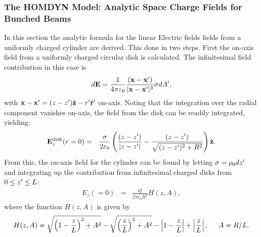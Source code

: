 \subsubsection{The HOMDYN Model: Analytic Space Charge Fields for Bunched Beams}

In this section the analytic formula for the linear Electric fields fields
from a uniformly charged cylinder are derived. This done in two steps. First
the on-axis field from a uniformly charged circular disk is calculated. The
infinitesimal field contribution in this case is
%
\begin{eqnarray}
d\mathbf{E} =
\frac{1}{4\pi\epsilon_0}\frac{(\mathbf{x}-\mathbf{x}\primed)}
{|\mathbf{x}-\mathbf{x}\primed|^3}\sigma dA\primed,\nonumber
\end{eqnarray}
%
with $\mathbf{x}-\mathbf{x}^{\prime}=
(z-z^{\prime})\hat{\mathbf{z}}-r^{\prime}\hat{\mathbf{r}}^{\prime}$ on-axis.
Noting that the integration over the radial component vanishes on-axis, the
field from the disk can be readily integrated, yielding:
%
\begin{eqnarray}
\mathbf{E}_{z}^{\textmd{disk}}(r=0) &=&
\frac{\sigma}{2\epsilon_0}
\left(\frac{(z-z\primed)}{|z-z\primed|}-\frac{(z-z\primed)}{\sqrt{(z-z\primed)^2+R^2}}\right)\hat{\mathbf{z}}.
\end{eqnarray}
%
From this, the on-axis field for the cylinder can be found by letting $\sigma
= \rho_0dz^{\prime}$ and integrating up the contribution from infinitesimal
charged disks from $0\leq z^{\prime}\leq L$:
%
%
%
\begin{eqnarray}
{E}_z(=0)&=&\frac{Q}{2\pi\epsilon_0R^2}H(z,A),
\end{eqnarray}
%
where the function $H(z,A)$ is given by
%
\begin{eqnarray}
H(z,A) = \sqrt{\left(1-\frac{z}{L} \right)^2+A^2}-\sqrt{\left(\frac{z}{L}\right)^2 +A^2}
-\left|1-\frac{z}{L}\right| +\left|\frac{z}{L}\right|,\hspace{0.5cm}A = R/L.
\end{eqnarray}

